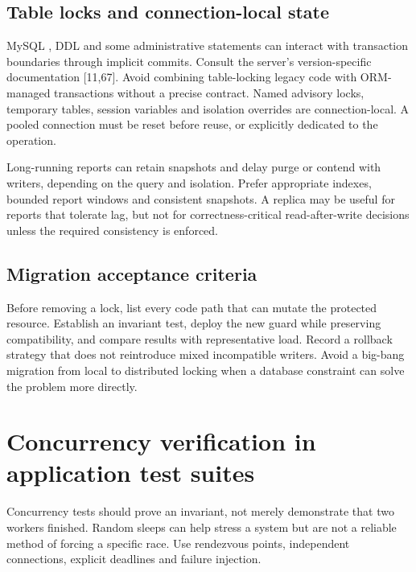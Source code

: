 \section{Table locks and connection-local state}
MySQL , DDL and some administrative statements can
interact with transaction boundaries through implicit commits. Consult the
server's version-specific documentation [11,67]. Avoid combining
table-locking legacy code with ORM-managed transactions without a precise
contract. Named advisory locks, temporary tables, session variables and
isolation overrides are connection-local. A pooled connection must be reset
before reuse, or explicitly dedicated to the operation.

Long-running reports can retain snapshots and delay purge or contend with
writers, depending on the query and isolation. Prefer appropriate indexes,
bounded report windows and consistent snapshots. A replica may be useful
for reports that tolerate lag, but not for correctness-critical read-after-write
decisions unless the required consistency is enforced.


\section{Migration acceptance criteria}
Before removing a lock, list every code path that can mutate the protected
resource. Establish an invariant test, deploy the new guard while preserving
compatibility, and compare results with representative load. Record a
rollback strategy that does not reintroduce mixed incompatible writers.
Avoid a big-bang migration from local to distributed locking when a database
constraint can solve the problem more directly.

\chapter{Concurrency verification in application test suites}
\label{ch:enterprise-testing}
Concurrency tests should prove an invariant, not merely demonstrate that
two workers finished. Random sleeps can help stress a system but are not
a reliable method of forcing a specific race. Use rendezvous points,
independent connections, explicit deadlines and failure injection.

